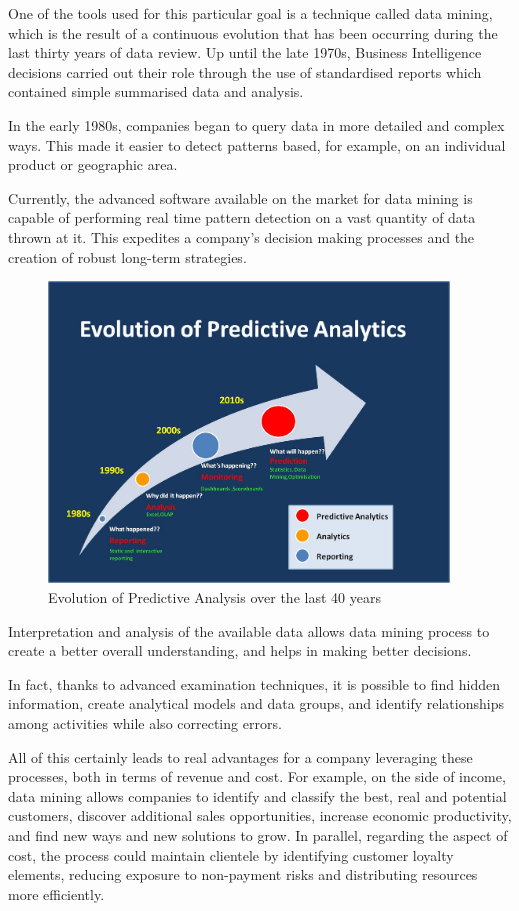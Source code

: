 One of the tools used for this particular goal is a technique called data mining, which is the result of a continuous evolution that has been occurring during the last thirty years of data review.
Up until the late 1970s, Business Intelligence decisions carried out their role through the use of standardised reports which contained simple summarised data and analysis.

In the early 1980s, companies began to query data in more detailed and complex ways. This made it easier to detect patterns based, for example, on an individual product or geographic area.

Currently, the advanced software available on the market for data mining is capable of performing real time pattern detection on a vast quantity of data thrown at it. This expedites a company’s decision making processes and the creation of robust long-term strategies.

\vspace{0.5cm}
\begin{figure}[htbp]
  \centering
    \includegraphics[height=8cm]{images/evolution}
  \caption{Evolution of Predictive Analysis over the last 40 years}
  \label{fig:predict}
\end{figure}
\vspace{0.5cm}
 

Interpretation and analysis of the available data allows data mining process to create a better overall understanding, and helps in making better decisions.

In fact, thanks to advanced examination techniques, it is possible to find hidden information, create analytical models and data groups, and identify relationships among activities while also correcting errors.

All of this certainly leads to real advantages for a company leveraging these processes, both in terms of revenue and cost. For example, on the side of income, data mining allows companies to identify and classify the best, real and potential customers, discover additional sales opportunities, increase economic productivity, and find new ways and new solutions to grow. In parallel, regarding the aspect of cost, the process could maintain clientele by identifying customer loyalty elements, reducing exposure to non-payment risks and distributing resources more efficiently.


